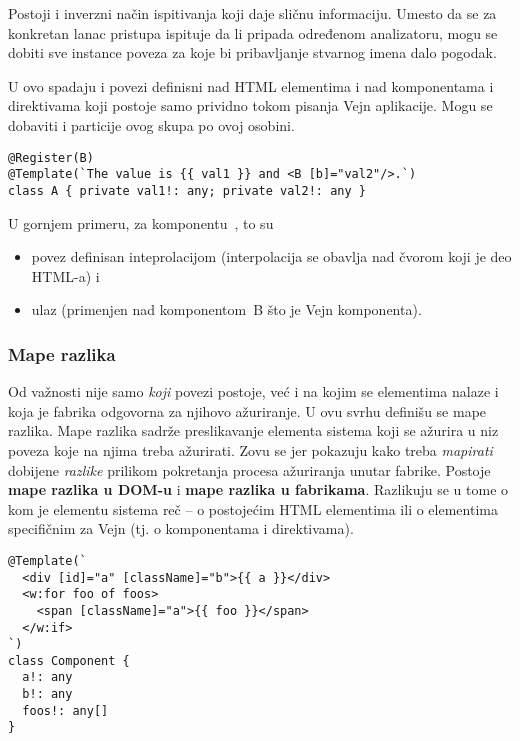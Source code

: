 Postoji i inverzni način ispitivanja koji daje sličnu informaciju.
Umesto da se za konkretan lanac pristupa ispituje da li pripada određenom analizatoru, mogu se dobiti sve instance poveza za koje bi pribavljanje stvarnog imena dalo pogodak.

U ovo spadaju i povezi definisni nad  HTML elementima i nad komponentama i direktivama koji postoje samo prividno tokom pisanja Vejn aplikacije.
Mogu se dobaviti i particije ovog skupa po ovoj osobini.

\begin{lstlisting}
@Register(B)
@Template(`The value is {{ val1 }} and <B [b]="val2"/>.`)
class A { private val1!: any; private val2!: any }
\end{lstlisting}

U gornjem primeru, za komponentu~, to su

\begin{itemize}
  \item povez definisan inteprolacijom  (interpolacija se obavlja nad  čvorom koji je deo HTML-a) i
  \item ulaz \code{ba]="val2"} (primenjen nad komponentom~\code B što je Vejn komponenta).
\end{itemize}

\subsubsection{Mape razlika}\label{sec:getDomDiffMap}\label{sec:getFaDiffMap}

Od važnosti nije samo \emph{koji} povezi postoje, već i na kojim se elementima nalaze i koja je fabrika odgovorna za njihovo ažuriranje.
U ovu svrhu definišu se mape razlika.
Mape razlika sadrže preslikavanje elementa sistema koji se ažurira u niz poveza koje na njima treba ažurirati.
Zovu se  jer pokazuju kako treba \emph{mapirati} dobijene \emph{razlike} prilikom pokretanja procesa ažuriranja unutar fabrike.
Postoje \textbf{mape razlika u DOM-u} i \textbf{mape razlika u fabrikama}.
Razlikuju se u tome o kom je elementu sistema reč -- o postojećim HTML elementima ili o elementima specifičnim za Vejn (tj. o komponentama i direktivama).

\begin{lstlisting}
@Template(`
  <div [id]="a" [className]="b">{{ a }}</div>
  <w:for foo of foos>
    <span [className]="a">{{ foo }}</span>
  </w:if>
`)
class Component {
  a!: any
  b!: any
  foos!: any[]
}
\end{lstlisting}

